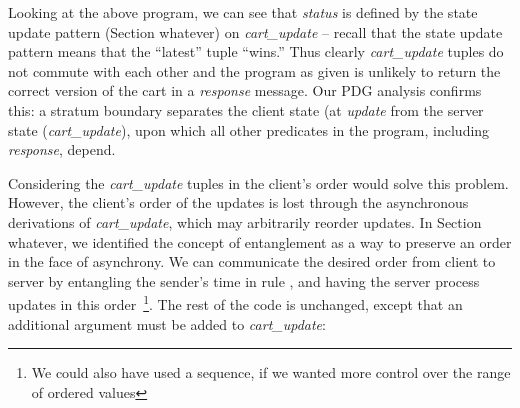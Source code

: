 Looking at the above program, we can see that {\em status} is defined by the
state update pattern (Section whatever) on {\em cart\_update} -- recall that
the state update pattern means that the ``latest'' tuple ``wins.'' Thus clearly
{\em cart\_update} tuples do not commute with each other
and the program as
given is unlikely to return the correct version of the cart in a {\em response}
message.  Our PDG analysis confirms this: a stratum boundary separates the client state
(at {\em update} from the server state ({\em cart\_update}), upon which all other 
predicates in the program, including {\em response}, depend.

Considering the {\em cart\_update} tuples in the client's order would solve
this problem.  However, the client's order of the updates is lost through the
asynchronous derivations of {\em cart\_update}, which may arbitrarily reorder
updates.  In Section whatever, we identified the concept of entanglement as a
way to preserve an order in the face of asynchrony.  We can communicate the
desired order from client to server by entangling the sender's time in rule
, and having the server process updates in this order~\footnote{
We could also have used a sequence, if we wanted more control over the range of ordered
values}.
The rest of the code is unchanged, except that an additional argument must be
added to {\em cart\_update}:

